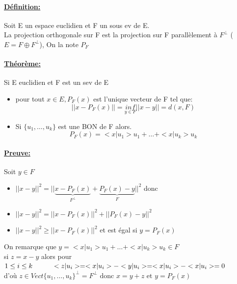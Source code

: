 \documentclass{article}
\newcommand\tab[1][1cm]{\hspace*{#1}}
\begin{document}
\paragraph{\underline{Définition:}} Soit E un espace euclidien et F un sous ev de E.\\
La projection orthogonale sur F est la projection sur F parallèlement à $F^\perp$ ($E = F \oplus F^\perp$), On la note $P_F$

\paragraph{\underline{Théorème:}} Si E euclidien et F est un sev de E
\begin{itemize}
    \item pour tout $x \in E, P_F(x)$ est l'unique vecteur de F tel que:
$$||x - P_F(x)|| = \underset{y \in F}{inf} ||x - y|| = d(x, F)$$
    \item Si $\{u_1, \dots, u_k\}$ est une BON de F alors.
$$P_F(x) = <x|u_1>u_1 + \dots + <x|u_k>u_k$$
\end{itemize}

\paragraph{\underline{Preuve:}} Soit $y \in F$
\begin{itemize}
    \item[] $||x - y||^2 = ||\underset{F^\perp}{\underbrace{x - P_F(x)}} + \underset{F}{\underbrace{P_F(x) - y}}||^2$ donc
    \item[] $||x - y||^2 = ||x - P_F(x)||^2 + ||P_F(x) - y||^2$
    \item[] $||x - y||^2 \geq ||x - P_F(x)||^2$ et est égal si $y = P_F(x)$
\end{itemize}

On remarque que $y = <x|u_1>u_1 + \dots + <x|u_k>u_k \in F$\\
si $z = x - y$ alors pour $1 \leq i \leq k \tab <z|u_i> = <x|u_i> - <y|u_i> = <x|u_i> - <x|u_i> = 0$\\
d'où $z \in Vect\{u_1, \dots, u_k\}^\perp = F^\perp \mbox{ donc } x = y + z \mbox{ et } y = P_F(x)$ 
\end{document}
